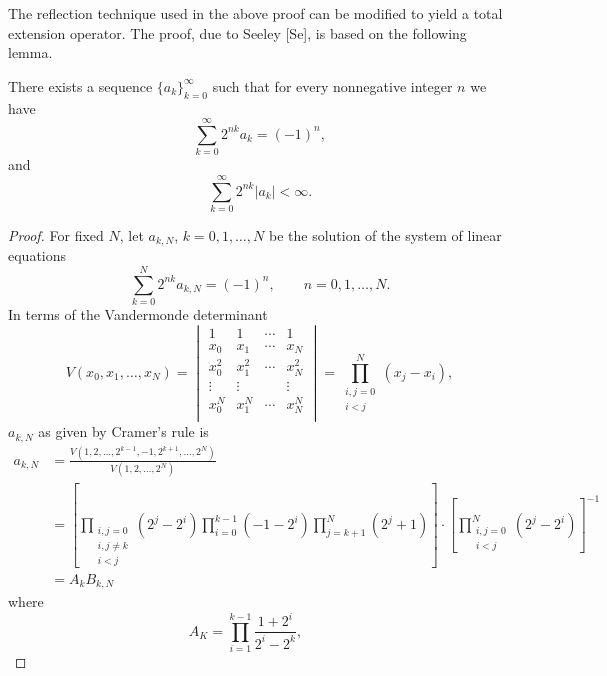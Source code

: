 The reflection technique used in the above proof can be modified to yield
a total extension operator. The proof, due to Seeley [Se], is based on the 
following lemma.

\begin{lemma}
  There exists a sequence $\{a_k\}_{k=0}^\infty$ such that for every
  nonnegative integer $n$ we have
  \begin{equation}\label{eq:5.20}
    \sum_{k=0}^\infty 2^{nk} a_k = (-1)^n,
  \end{equation}
  and
  \begin{equation}\label{eq:5.21}
    \sum_{k=0}^\infty 2^{nk} |a_k| < \infty.
  \end{equation}
\end{lemma}

\begin{proof}
  For fixed $N$, let $a_{k,N}$, $k=0,1,\ldots,N$ be the solution of
  the system of linear equations
  \begin{equation}\label{eq:5.22}
    \sum_{k=0}^N 2^{nk} a_{k,N} = (-1)^n, \qquad n=0,1,\ldots,N.
  \end{equation}
  In terms of the Vandermonde determinant
  \[ V(x_0,x_1,\ldots,x_N) = 
     \begin{vmatrix}
      1      & 1      & \cdots & 1      \\
      x_0    & x_1    & \cdots & x_N    \\
      x_0^2  & x_1^2  & \cdots & x_N^2  \\
      \vdots & \vdots &        & \vdots \\
      x_0^N  & x_1^N  & \cdots & x_N^N  \\
     \end{vmatrix}
     = \prod_{\substack{i,j=0 \\ i<j}}^N (x_j - x_i), \]
  $a_{k,N}$ as given by Cramer's rule is
  \begin{align*}
    a_{k,N}
    & = \frac{V(1,2,\ldots,2^{k-1},-1,2^{k+1},\ldots,2^N)}{V(1,2,\ldots,2^N)} \\
    & = \left[\prod_{\substack{i,j=0 \\ i,j\neq k \\ i<j}} (2^j-2^i)
               \prod_{i=0}^{k-1} (-1-2^i)
               \prod_{j=k+1}^N (2^j+1)\right] \cdot
        \left[\prod_{\substack{i,j=0 \\ i<j}}^N (2^j-2^i)\right]^{-1} \\
    & = A_k B_{k,N}
  \end{align*}
  where
  \[ A_K = \prod_{i=1}^{k-1} \frac{1+2^i}{2^i-2^k}, \qquad 
\]
\end{proof}
